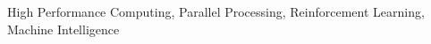 \begin{IEEEkeywords}
High Performance Computing, Parallel Processing, Reinforcement Learning, Machine Intelligence
\end{IEEEkeywords}
%
\begin{acronym}[Bash]
\end{acronym}
